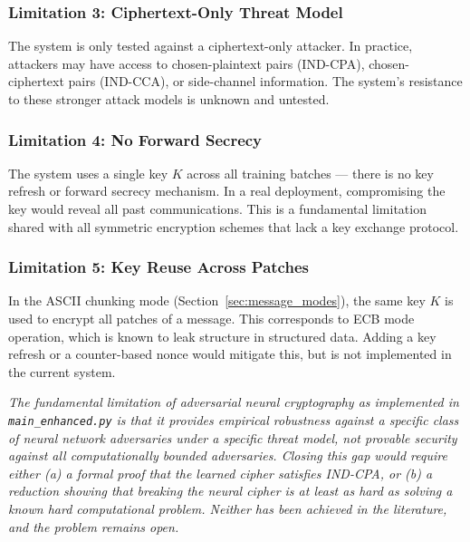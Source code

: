 \documentclass[12pt, a4paper]{article}
\newcommand{\code}[1]{\texttt{\color{CodeRed}#1}}
\begin{document}
\subsubsection*{Limitation 3: Ciphertext-Only Threat Model}

The system is only tested against a ciphertext-only attacker. In
practice, attackers may have access to chosen-plaintext pairs
(IND-CPA), chosen-ciphertext pairs (IND-CCA), or side-channel
information. The system's resistance to these stronger attack models
is unknown and untested.

\subsubsection*{Limitation 4: No Forward Secrecy}

The system uses a single key $K$ across all training batches ---
there is no key refresh or forward secrecy mechanism. In a real
deployment, compromising the key would reveal all past communications.
This is a fundamental limitation shared with all symmetric encryption
schemes that lack a key exchange protocol.

\subsubsection*{Limitation 5: Key Reuse Across Patches}

In the ASCII chunking mode (Section~\ref{sec:message_modes}), the same key $K$ is
used to encrypt all patches of a message. This corresponds to ECB
mode operation, which is known to leak structure in structured data.
Adding a key refresh or a counter-based nonce would mitigate this,
but is not implemented in the current system.

\begin{tcolorbox}[researchbox, title={The Provable Security Gap}]
  \itshape
  The fundamental limitation of adversarial neural cryptography as
  implemented in \code{main\_enhanced.py} is that it provides
  \emph{empirical} robustness against a specific class of neural
  network adversaries under a specific threat model, not
  \emph{provable} security against all computationally bounded
  adversaries. Closing this gap would require either (a) a formal
  proof that the learned cipher satisfies IND-CPA, or (b) a reduction
  showing that breaking the neural cipher is at least as hard as
  solving a known hard computational problem. Neither has been
  achieved in the literature, and the problem remains open.
\end{tcolorbox}
\end{document}
